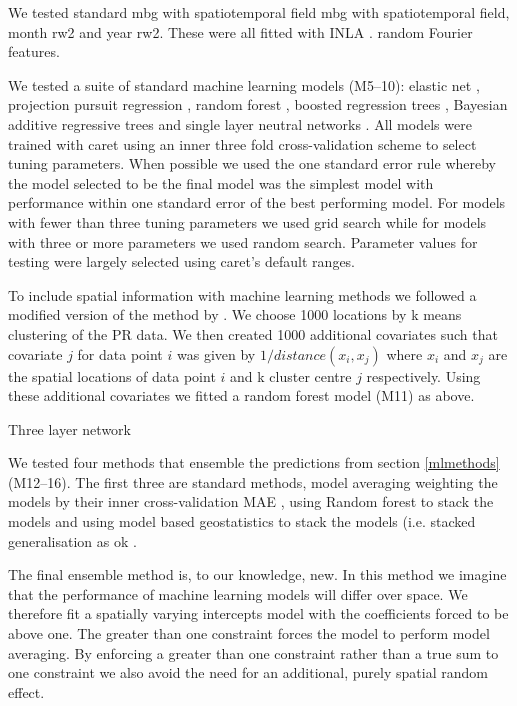 \documentclass{bmcart}
\begin{document}
We tested
standard mbg with spatiotemporal field
mbg with spatiotemporal field, month rw2 and year rw2.
These were all fitted with INLA \cite{INLA}.
random Fourier features.


We tested a suite of standard machine learning models (M5--10): elastic net \cite{}, projection pursuit regression \cite{}, random forest \cite{ranger},  boosted regression trees \cite{xgboost}, Bayesian additive regressive trees \cite{} and single layer neutral networks \cite{nnet}.
All models were trained with caret \cite{caret} using an inner three fold cross-validation scheme to select tuning parameters.
When possible we used the one standard error rule \cite{breiman1984classification} whereby the model selected to be the final model was the simplest model with performance within one standard error of the best performing model.
For models with fewer than three tuning parameters we used grid search while for models with three or more parameters we used random search.
Parameter values for testing were largely selected using caret's default ranges.


To include spatial information with machine learning methods we followed a modified version of the method by \cite{}.
We choose 1000 locations by k means clustering of the PR data.
We then created 1000 additional covariates such that covariate $j$ for data point $i$ was given by $1 / distance (x_i, x_j)$ where $x_i$ and $x_j$ are the spatial locations of data point $i$ and k cluster centre $j$ respectively.
Using these additional covariates we fitted a random forest model (M11) as above.



Three layer network



We tested four methods that ensemble the predictions from section \ref{mlmethods} (M12--16).
The first three are standard methods, model averaging weighting the models by their inner cross-validation MAE \cite{}, using Random forest to stack the models \cite{} and using model based geostatistics to stack the models (i.e. stacked generalisation as ok \cite{bhatt2017improved}.

The final ensemble method is, to our knowledge, new.
In this method we imagine that the performance of machine learning models will differ over space.
We therefore fit a spatially varying intercepts model with the coefficients forced to be above one.
The greater than one constraint forces the model to perform model averaging.
By enforcing a greater than one constraint rather than a true sum to one constraint we also avoid the need for an additional, purely spatial random effect.
\end{document}
